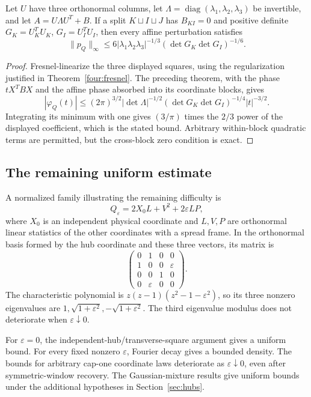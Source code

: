 \begin{corollary}\label{lim:block-quadratic}
Let $U$ have three orthonormal columns, let $\Lambda=\operatorname{diag}(\lambda_1,\lambda_2,\lambda_3)$ be invertible, and let $A=U\Lambda U^T+B$. If a split $K\sqcup I\sqcup J$ has $B_{KI}=0$ and positive definite $G_K=U_K^TU_K$, $G_I=U_I^TU_I$, then every affine perturbation satisfies
\[
 \|p_Q\|_\infty\le6|\lambda_1\lambda_2\lambda_3|^{-1/3}
 (\det G_K\det G_I)^{-1/6}.
\]
\end{corollary}
\begin{proof}
Fresnel-linearize the three displayed squares, using the regularization justified in Theorem~\ref{four:fresnel}. The preceding theorem, with the phase $tX^TBX$ and the affine phase absorbed into its coordinate blocks, gives
\[
 |\varphi_Q(t)|\le(2\pi)^{3/2}|\det\Lambda|^{-1/2}
 (\det G_K\det G_I)^{-1/4}|t|^{-3/2}.
\]
Integrating its minimum with one gives $(3/\pi)$ times the $2/3$ power of the displayed coefficient, which is the stated bound. Arbitrary within-block quadratic terms are permitted, but the cross-block zero condition is exact.
\end{proof}

\subsection{The remaining uniform estimate}

A normalized family illustrating the remaining difficulty is
\begin{equation}\label{eq:remaining-core}
 Q_\varepsilon=2X_0L+V^2+2\varepsilon LP,
\end{equation}
where $X_0$ is an independent physical coordinate and $L,V,P$ are orthonormal linear statistics of the other coordinates with a spread frame. In the orthonormal basis formed by the hub coordinate and these three vectors, its matrix is
\[
 \begin{pmatrix}
 0&1&0&0\\1&0&0&\varepsilon\\0&0&1&0\\0&\varepsilon&0&0
 \end{pmatrix}.
\]
The characteristic polynomial is $z(z-1)(z^2-1-\varepsilon^2)$, so its three nonzero eigenvalues are $1,\sqrt{1+\varepsilon^2},-\sqrt{1+\varepsilon^2}$. The third eigenvalue modulus does not deteriorate when $\varepsilon\downarrow0$.

For $\varepsilon=0$, the independent-hub/transverse-square argument gives a uniform bound. For every fixed nonzero $\varepsilon$, Fourier decay gives a bounded density. The bounds for arbitrary cap-one coordinate laws deteriorate as $\varepsilon\downarrow0$, even after symmetric-window recovery. The Gaussian-mixture results give uniform bounds under the additional hypotheses in Section~\ref{sec:hubs}.

